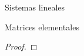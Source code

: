 \documentclass[a4paper,12pt,twoside,spanish]{amsbook}
\theoremstyle{definition}
\theoremstyle{remark}
\begin{document}
\begin{chapter}{Sistemas lineales}
\begin{section}{Matrices elementales}
\begin{proof}
				\begin{comment}
				\begin{enumerate}
				\item[(1)] Analicemos primero la operación elemental $e$ que es multiplicar la fila $r$ por $c\not=0$. En  ese caso  
				\begin{equation*}
				e(I) = \begin{bmatrix} 1&0& \cdots& &0 \\ &\ddots& & & \\ 0& & c & &0 \\ &&  &\ddots& \\ 0&& \cdots& &1		 		
				\end{bmatrix}
				\begin{matrix} && \\ && \\ \leftarrow&\text{fila $r$,}& \\ && \\ &&	 		
				\end{matrix}
				\end{equation*}
				es decir, la matriz diagonal con 1's en la diagonal excepto en la fila $r$ y columna $r$ donde vale $c$, en símbolos
				\begin{equation*}
				e(I)_{ij} = \left\{ \begin{matrix*}[l]
				1& \quad &\text{si $i=j$, $i\not=r$} \\
				c& \quad &\text{si $i=j$, $i=r$} \\
				0 & \quad &\text{si $i\not=j$}
				\end{matrix*}\right..
				\end{equation*}
				

\end{comment}
\end{proof}
\end{section}
\end{chapter}
\end{document}
